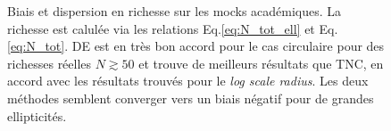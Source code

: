 \documentclass[a4paper,11pt]{article}
\numberwithin{equation}{section}
\begin{document}
\begin{figure}
\begin{minipage}[b]{\textwidth}
		  \caption{Biais et dispersion en richesse sur les mocks académiques. La richesse est calulée via les relations Eq.\ref{eq:N_tot_ell} et Eq.\ref{eq:N_tot}. DE est en très bon accord pour le cas circulaire pour des richesses réelles $N \gtrsim 50$ et trouve de meilleurs résultats que TNC, en accord avec les résultats trouvés pour le \textit{log scale radius}. Les deux méthodes semblent converger vers un biais négatif pour de grandes ellipticités.}
  	\end{minipage}
  \end{figure}
  
\end{document}
